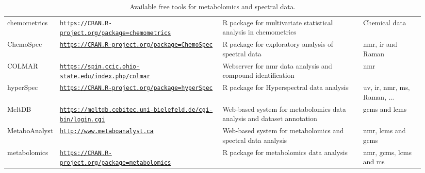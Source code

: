 \begin{table}[!ht]
	\caption{Available free tools for metabolomics and spectral data.} 
	\label{tools}
	\begin{scriptsize}
		\tabulinesep=1.2mm
		\begin{tabu}{|m{1.8cm}|m{5.2cm}|m{5cm}|m{2.4cm}|}		
			 &  &  &  \\
			\hline
			
			chemometrics & \href{https://CRAN.R-project.org/package=chemometrics}{\nolinkurl{https://CRAN.R-project.org/package=chemometrics}} & R package for multivariate statistical analysis in chemometrics & Chemical data \\ 				
			\hline 
			
			ChemoSpec & \href{https://CRAN.R-project.org/package=ChemoSpec}{\nolinkurl{https://CRAN.R-project.org/package=ChemoSpec}} & R package for exploratory analysis of spectral data & \gls{nmr}, \gls{ir} and Raman  \\ 		
			\hline 
			
			COLMAR & \href{https://spin.ccic.ohio-state.edu/index.php/colmar}{\nolinkurl{https://spin.ccic.ohio-state.edu/index.php/colmar}} & Webserver for \gls{nmr} data analysis and compound identification & \gls{nmr} \\ 
			
			\hline 
			hyperSpec & \href{https://CRAN.R-project.org/package=hyperSpec}{\nolinkurl{https://CRAN.R-project.org/package=hyperSpec}} & R package for Hyperspectral data analysis & \gls{uv}, \gls{ir}, \gls{nmr}, \gls{ms}, Raman, ... \\ 
			
			\hline 
			MeltDB & \href{https://meltdb.cebitec.uni-bielefeld.de/cgi-bin/login.cgi}{\nolinkurl{https://meltdb.cebitec.uni-bielefeld.de/cgi-bin/login.cgi}} & Web-based system for metabolomics data analysis and dataset annotation & \gls{gcms} and \gls{lcms} \\ 
			
			\hline 
			MetaboAnalyst & \href{http://www.metaboanalyst.ca}{\nolinkurl{http://www.metaboanalyst.ca}} & Web-based system for metabolomics and spectral data analysis & \gls{nmr}, \gls{lcms} and \gls{gcms} \\ 
			
			\hline
			metabolomics & \href{https://CRAN.R-project.org/package=metabolomics}{\nolinkurl{https://CRAN.R-project.org/package=metabolomics}} & R package for metabolomics data analysis & \gls{nmr}, \gls{gcms}, \gls{lcms} and \gls{ms} \\
			

\end{tabu}
\end{scriptsize}
\end{table}
